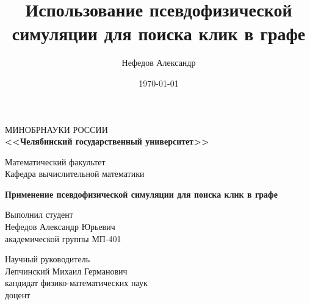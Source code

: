 \documentclass{beamer}
\title[Поиск клик]{Использование псевдофизической симуляции для поиска клик в графе} %
\author{Нефедов Александр} %
\institute[ЧелГУ] %
{
Челябинский Государственный Университет \\ %
\medskip
\textit{nefedov.alexander91@yandex.ru} %
}
\date{\today} %
\theoremstyle{plain}
\begin{document}

\begin{frame}
  \begin{center}
    \tiny{МИНОБРНАУКИ РОССИИ} \\
    \footnotesize\textbf{<<Челябинский государственный университет>>}
    \vspace{2mm}

    \footnotesize{Математический факультет} \\
    \tiny{Кафедра вычислительной математики}
    \vspace{2mm}

    {\footnotesize\textbf{Применение псевдофизической симуляции для поиска клик в графе}}
  \end{center}

    \tiny{Выполнил студент} \\
    \footnotesize{Нефедов Александр Юрьевич}\\
    \tiny{академической группы МП-401}\\

  \vspace{4mm}

  \tiny{Научный руководитель} \\
    \footnotesize{Лепчинский Михаил Германович}\\
    \tiny{кандидат физико-математических наук}\\
    \tiny{доцент} \\
  \begin{center}
    \small\the\year
  \end{center}
\end{frame}
\end{document}
